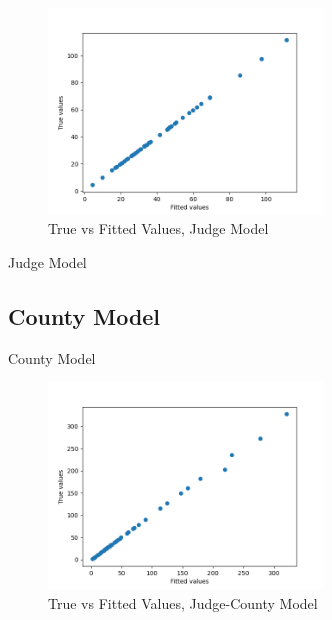 \documentclass[11pt]{article}
\begin{document}
    \begin{figure}[H]
      \centering
      \includegraphics[width=0.65\textwidth]{../../../output/figures/Exploration/fit_min_JudgeID}
      \caption{True vs Fitted Values, Judge Model}
    \end{figure}

    \begin{table}[H]
      \centering
      \caption{Judge Model}
      
    \end{table}

  \subsection{County Model}

    \begin{table}[H]
      \centering
      \caption{County Model}
      
    \end{table}

    \begin{figure}[H]
      \centering
      \includegraphics[width=0.65\textwidth]{../../../output/figures/Exploration/fit_min_County}
      \caption{True vs Fitted Values, Judge-County Model}
    \end{figure}
\end{document}
